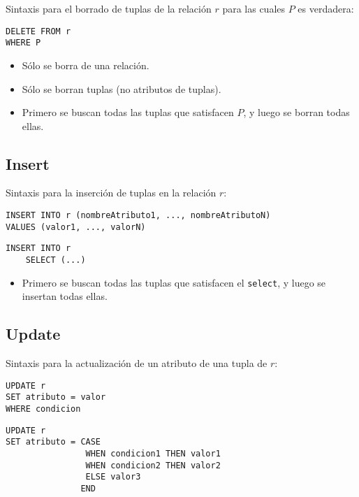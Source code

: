 \documentclass[a4paper, twoside]{article}
\begin{document}
Sintaxis para el borrado de tuplas de la relación $r$ para las cuales
$P$ es verdadera:

\begin{lstlisting}
DELETE FROM r
WHERE P
\end{lstlisting}

\begin{itemize}
\item Sólo se borra de una relación.
\item Sólo se borran tuplas (no atributos de tuplas).
\item Primero se buscan todas las tuplas que satisfacen $P$, y luego se
borran todas ellas.
\end{itemize}

\subsection{Insert}

Sintaxis para la inserción de tuplas en la relación $r$:

\begin{lstlisting}
INSERT INTO r (nombreAtributo1, ..., nombreAtributoN)
VALUES (valor1, ..., valorN)
\end{lstlisting}


\begin{lstlisting}
INSERT INTO r 
	SELECT (...)
\end{lstlisting}

\begin{itemize}
\item Primero se buscan todas las tuplas que satisfacen el \texttt{select},
y luego se insertan todas ellas.
\end{itemize}

\subsection{Update}

Sintaxis para la actualización de un atributo de una tupla de $r$:

\begin{lstlisting}
UPDATE r
SET atributo = valor
WHERE condicion
\end{lstlisting}


\begin{lstlisting}
UPDATE r
SET atributo = CASE
				WHEN condicion1 THEN valor1
				WHEN condicion2 THEN valor2
				ELSE valor3
			   END
\end{lstlisting}
\end{document}
